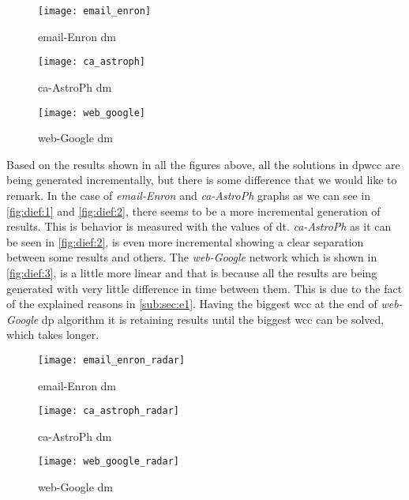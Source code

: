   \begin{figure}[!htb]
      \centering
      \begin{minipage}{0.33\textwidth}
       \texttt{[image: email\_enron]}
        \caption{email-Enron \acrshort{dm}}
        \label{fig:dief:1}
      \end{minipage}%
      \begin{minipage}{0.33\textwidth}
       \texttt{[image: ca\_astroph]}
        \caption{ca-AstroPh \acrshort{dm}}
        \label{fig:dief:2}
      \end{minipage}%
      \begin{minipage}{0.33\textwidth}
       \texttt{[image: web\_google]}
        \caption{web-Google \acrshort{dm}}
        \label{fig:dief:3}
      \end{minipage}
  \end{figure}
  
  Based on the results shown in all the figures above, all the solutions in \acrshort{dpwcc} are being generated incrementally, but there is some difference that we would like to remark. In the case of \emph{email-Enron} and \emph{ca-AstroPh} graphs as we can see in \autoref{fig:dief:1} and \autoref{fig:dief:2}, there seems to be a more incremental generation of results. This is behavior is measured with the values of \acrfull{dt}. \emph{ca-AstroPh} as it can be seen in \autoref{fig:dief:2}, is even more incremental showing a clear separation between some results and others. The \emph{web-Google} network which is shown in \autoref{fig:dief:3}, is a little more linear and that is because all the results are being generated with very little difference in time between them. This is due to the fact of the explained reasons in \autoref{sub:sec:e1}. Having the biggest \acrshort{wcc} at the end of \emph{web-Google} \acrshort{dp} algorithm it is retaining results until the biggest \acrshort{wcc} can be solved, which takes longer. 
  
  \begin{figure}[!htb]
      \centering
      \begin{minipage}{0.33\textwidth}
       \texttt{[image: email\_enron\_radar]}
        \caption{email-Enron \acrshort{dm}}
        \label{fig:dief:rad:1}
      \end{minipage}%
      \begin{minipage}{0.33\textwidth}
       \texttt{[image: ca\_astroph\_radar]}
        \caption{ca-AstroPh \acrshort{dm}}
        \label{fig:dief:rad:2}
      \end{minipage}%
      \begin{minipage}{0.33\textwidth}
       \texttt{[image: web\_google\_radar]}
        \caption{web-Google \acrshort{dm}}
        \label{fig:dief:rad:3}
      \end{minipage}
  \end{figure}
  
